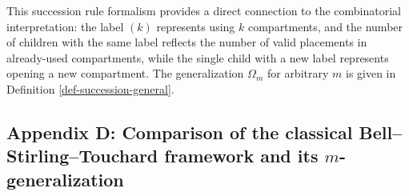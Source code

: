 \documentclass[a4paper]{amsart}
\numberwithin{equation}{section}
\begin{document}
This succession rule formalism provides a direct connection to the combinatorial interpretation: the label $(k)$ represents using $k$ compartments, and the number of children with the same label reflects the number of valid placements in already-used compartments, while the single child with a new label represents opening a new compartment. The generalization $\Omega_m$ for arbitrary $m$ is given in Definition \ref{def-succession-general}.

\pagebreak
\begin{landscape}
\section*{Appendix D: Comparison of the classical Bell--Stirling--Touchard framework and its $m$-generalization}


\end{landscape}
\end{document}
